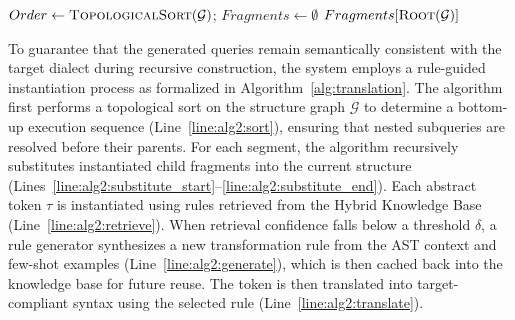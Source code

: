 \documentclass[sigconf,review,anonymous]{acmart}
\begin{document}
\begin{algorithm}[htbp]
\small
\caption{Rule-Guided Recursive Dialect Instantiation}
\label{alg:translation}



$Order \leftarrow \textsc{TopologicalSort}(\mathcal{G})$; $Fragments \leftarrow \emptyset$ \label{line:alg2:sort} 
\Return $Fragments[\textsc{Root}(\mathcal{G})]$ \label{line:alg2:assemble} 
\end{algorithm}

To guarantee that the generated queries remain semantically consistent with the target dialect during recursive construction, the system employs a rule-guided instantiation process as formalized in Algorithm~\ref{alg:translation}. The algorithm first performs a topological sort on the structure graph $\mathcal{G}$ to determine a bottom-up execution sequence (Line~\ref{line:alg2:sort}), ensuring that nested subqueries are resolved before their parents. For each segment, the algorithm recursively substitutes instantiated child fragments into the current structure (Lines~\ref{line:alg2:substitute_start}--\ref{line:alg2:substitute_end}).
Each abstract token $\tau$ is instantiated using rules retrieved from the Hybrid Knowledge Base (Line~\ref{line:alg2:retrieve}). When retrieval confidence falls below a threshold $\delta$, a rule generator synthesizes a new transformation rule from the AST context and few-shot examples (Line~\ref{line:alg2:generate}), which is then cached back into the knowledge base for future reuse. The token is then translated into target-compliant syntax using the selected rule (Line~\ref{line:alg2:translate}).
\end{document}

